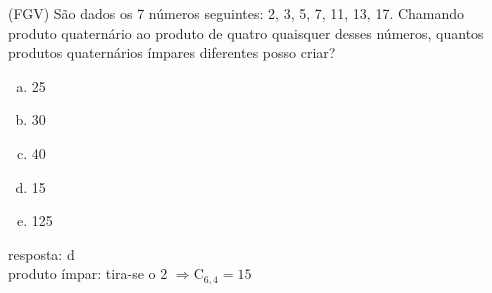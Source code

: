 \begin{ex}
 (FGV) São dados os 7 números seguintes: 2, 3, 5, 7, 11, 13, 17. Chamando produto quaternário ao produto de quatro quaisquer desses números, quantos produtos quaternários ímpares diferentes posso criar?
    \begin{enumerate}[(a)]
    \item 25
    \item 30
    \item 40
    \item 15
    \item 125
    \end{enumerate}
      \begin{sol}
       resposta: d \\
       produto ímpar: tira-se o 2 $\Longrightarrow \mathrm{C}_{6,4}=15$
       
      \end{sol}
\end{ex}